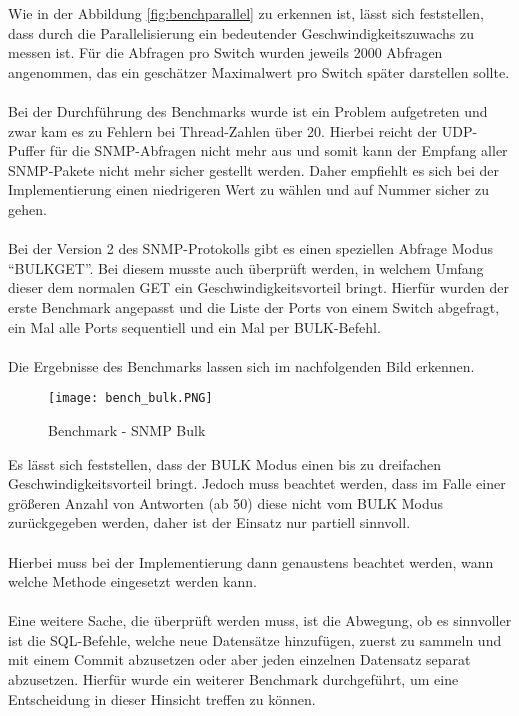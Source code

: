 Wie in der Abbildung \ref{fig:benchparallel} zu erkennen ist, lässt sich feststellen, dass durch die Parallelisierung ein bedeutender Geschwindigkeitszuwachs zu messen ist.
Für die Abfragen pro Switch wurden jeweils 2000 Abfragen angenommen, das ein geschätzer Maximalwert pro Switch später darstellen sollte.\\\\
Bei der Durchführung des Benchmarks wurde ist ein Problem  aufgetreten und zwar kam es zu Fehlern bei Thread-Zahlen über 20. Hierbei reicht der UDP-Puffer für die SNMP-Abfragen nicht mehr aus und somit kann der Empfang aller SNMP-Pakete nicht mehr sicher gestellt werden.
Daher empfiehlt es sich bei der Implementierung einen niedrigeren Wert zu wählen und auf Nummer sicher zu gehen.\\\\
Bei der Version 2 des SNMP-Protokolls gibt es einen speziellen Abfrage Modus “BULKGET”. Bei diesem musste auch überprüft werden, in welchem Umfang dieser dem normalen GET ein Geschwindigkeitsvorteil bringt. Hierfür wurden der erste Benchmark angepasst und die Liste der Ports von einem Switch abgefragt, ein Mal alle Ports sequentiell und ein Mal per BULK-Befehl.\\\\
Die Ergebnisse des Benchmarks lassen sich im nachfolgenden Bild erkennen.\\

\begin{figure}[H]
\centering
\texttt{[image: bench\_bulk.PNG]}
\caption{Benchmark - SNMP Bulk}
\label{fig:benchsnmpbulk}
\end{figure}

Es lässt sich feststellen, dass der BULK Modus einen bis zu dreifachen Geschwindigkeitsvorteil bringt. Jedoch muss beachtet werden, dass im Falle einer größeren Anzahl von Antworten (ab 50) diese nicht vom BULK Modus zurückgegeben werden, daher ist der Einsatz nur partiell sinnvoll.\\\\
Hierbei muss bei der Implementierung dann genaustens beachtet werden, wann welche Methode eingesetzt werden kann.\\\\
Eine weitere Sache, die überprüft werden muss, ist die Abwegung, ob es sinnvoller ist die SQL-Befehle, welche neue Datensätze hinzufügen, zuerst zu sammeln und mit einem Commit abzusetzen oder aber jeden einzelnen Datensatz separat abzusetzen.
Hierfür wurde ein weiterer Benchmark durchgeführt, um eine Entscheidung in dieser Hinsicht treffen zu können.\\

